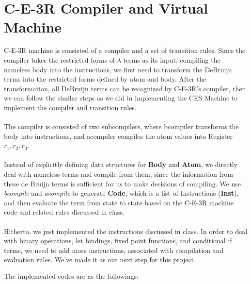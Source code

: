 \documentclass[10pt]{article}
\begin{document}
\section{C-E-3R Compiler and Virtual Machine}
C-E-3R machine is consisted of a compiler and a set of transition rules. Since the compiler takes the restricted forms of $\lambda$ terms as its input, compiling the nameless body into the instructions, we first need to transform the DeBruijn terms into the restricted forms defined by atom and body. After the transformation, all DeBruijn terms can be recognized by C-E-3R's compiler, then we can follow the similar steps as we did in implementing the CES Machine to implement the compiler and transition rules.\\\\
The compiler is consisted of two subcompilers, where bcompiler transforms the body into instructions, and acompiler compiles the atom values into Register $r_1,r_2,r_3$.\\

\paragraph{}
Instead of explicitly defining data structures for \textbf{Body} and \textbf{Atom}, we directly deal with nameless terms and compile from them, since the information from these de Bruijn terms is sufficient for us to make decisions of compiling. We use \textit{bcompile} and \textit{acompile} to generate \textbf{Code}, which is a list of Instructions (\textbf{Inst}), and then evaluate the term from state to state based on the C-E-3R machine code and related rules discussed in class.

\paragraph{}
Hitherto, we just implemented the instructions discussed in class. In order to deal with binary operations, let bindings, fixed point functions, and conditional if terms, we need to add more instructions, associated with compilation and evaluation rules. We've made it as our next step for this project.


The implemented codes are as the followings:
\end{document}
